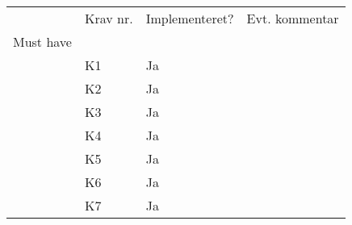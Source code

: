\documentclass[class=article, crop=false]{standalone}
\begin{document}
    \begin{table}[]
        \begin{tabular}{llll}
            & Krav nr. & Implementeret?     & Evt. kommentar                                                                                                                                                                                     \\
            Must have       &          &                    &                                                                                                                                                                                                    \\
            & K1       & Ja                 &                                                                                                                                                                                                    \\
            & K2       & Ja                 &                                                                                                                                                                                                    \\
            & K3       & Ja                 &                                                                                                                                                                                                    \\
            & K4       & Ja                 &                                                                                                                                                                                                    \\
            & K5       & Ja                 &                                                                                                                                                                                                    \\
            & K6       & Ja                 &                                                                                                                                                                                                    \\
            & K7       & Ja                 &                                                                                                                                                                                                    \\

\end{tabular}
\end{table}
\end{document}
